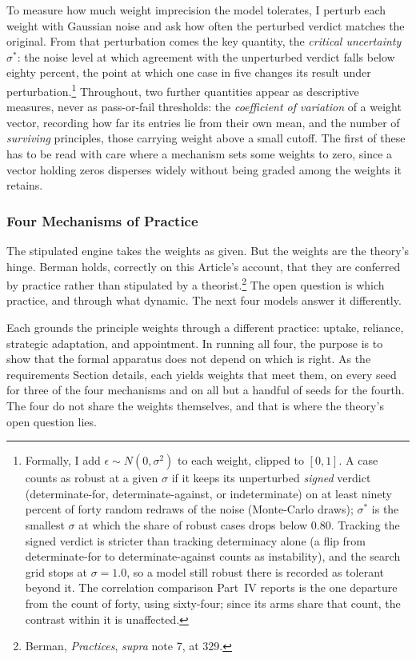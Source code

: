 To measure how much weight imprecision the model tolerates, I perturb each
weight with Gaussian noise and ask how often the perturbed verdict matches
the original. From that perturbation comes the key quantity, the \textit{critical
uncertainty} $\sigma^{*}$: the noise level at which agreement with the unperturbed verdict
falls below eighty percent, the point at which one case in five changes its
result under perturbation.\footnote{Formally, I add $\epsilon \sim N(0,
\sigma^2)$ to each weight, clipped to $[0,1]$. A case counts as robust at a
given $\sigma$ if it keeps its unperturbed \textit{signed} verdict
(determinate-for, determinate-against, or indeterminate) on at least ninety
percent of forty random redraws of the noise (Monte-Carlo draws); $\sigma^{*}$ is the smallest
$\sigma$ at which the share of robust cases drops below 0.80. Tracking the
signed verdict is stricter than tracking determinacy alone (a flip from
determinate-for to determinate-against counts as instability), and the
search grid stops at $\sigma = 1.0$, so a model still robust there is recorded
as tolerant beyond it. The correlation comparison Part~IV reports is the one
departure from the count of forty, using sixty-four; since its arms share that
count, the contrast within it is unaffected.} Throughout, two further quantities appear as descriptive measures, never as
pass-or-fail thresholds: the \textit{coefficient of variation} of a weight
vector, recording how far its entries lie from their own mean, and the
number of \textit{surviving} principles, those carrying weight above a small
cutoff. The first of these has to be read with care where a mechanism sets
some weights to zero, since a vector holding zeros disperses widely without
being graded among the weights it retains.

\subsubsection{Four Mechanisms of Practice}

The stipulated engine takes the weights as given. But the weights are the
theory's hinge. Berman holds, correctly on this Article's account, that
they are conferred by practice rather than stipulated by a
theorist.\footnote{Berman, \textit{Practices}, \textit{supra} note 7, at
329.} The open question is which practice, and through what dynamic. The next four models answer it differently.

Each grounds the principle weights through a different practice:
uptake, reliance, strategic adaptation, and appointment. In running all
four, the purpose is to show that the formal apparatus does not depend on
which is right. As the requirements Section details, each yields weights that meet them, on every seed for three of the four mechanisms and on all but
a handful of seeds for the fourth. The four do not share the weights themselves, and that is where the
theory's open question lies.

